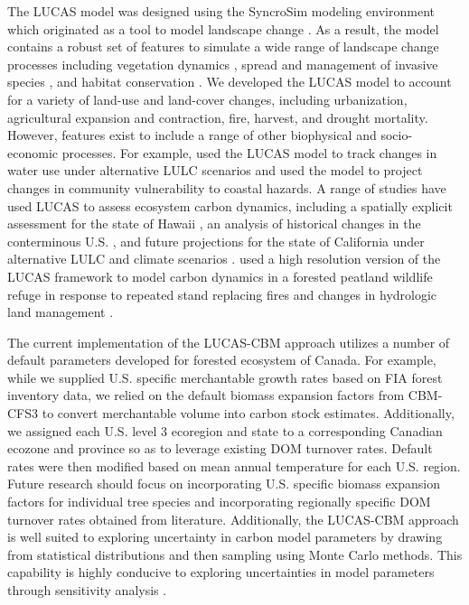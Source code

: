 \documentclass[
]{book}
\begin{document}
The LUCAS model was designed using the SyncroSim modeling environment which originated as a tool to model landscape change \citep{daniel2016state}. As a result, the model contains a robust set of features to simulate a wide range of landscape change processes including vegetation dynamics \citep{ford2019tool, miller2015combining}, spread and management of invasive species \citep{jarnevich2020assessing}, and habitat conservation \citep{d2019coupled}. We developed the LUCAS model to account for a variety of land-use and land-cover changes, including urbanization, agricultural expansion and contraction, fire, harvest, and drought mortality. However, features exist to include a range of other biophysical and socio-economic processes. For example, \citet{wilson2016future} used the LUCAS model to track changes in water use under alternative LULC scenarios and \citet{sleeter2017projecting} used the model to project changes in community vulnerability to coastal hazards. A range of studies have used LUCAS to assess ecosystem carbon dynamics, including a spatially explicit assessment for the state of Hawaii \citep{sleeter2017projected}, an analysis of historical changes in the conterminous U.S. \citep{sleeter2018effects}, and future projections for the state of California under alternative LULC and climate scenarios \citep{sleeter2019effects}. \citet{sleeter2017carbon} used a high resolution version of the LUCAS framework to model carbon dynamics in a forested peatland wildlife refuge in response to repeated stand replacing fires and changes in hydrologic land management \citep{sleeter2021enhanced}.

The current implementation of the LUCAS-CBM approach utilizes a number of default parameters developed for forested ecosystem of Canada. For example, while we supplied U.S. specific merchantable growth rates based on FIA forest inventory data, we relied on the default biomass expansion factors from CBM-CFS3 to convert merchantable volume into carbon stock estimates. Additionally, we assigned each U.S. level 3 ecoregion and state to a corresponding Canadian ecozone and province so as to leverage existing DOM turnover rates. Default rates were then modified based on mean annual temperature for each U.S. region. Future research should focus on incorporating U.S. specific biomass expansion factors for individual tree species \citep{jenkins2003national} and incorporating regionally specific DOM turnover rates obtained from literature. Additionally, the LUCAS-CBM approach is well suited to exploring uncertainty in carbon model parameters by drawing from statistical distributions and then sampling using Monte Carlo methods. This capability is highly conducive to exploring uncertainties in model parameters through sensitivity analysis \citep{sleeter2019effects, white2008practical}.
\end{document}
